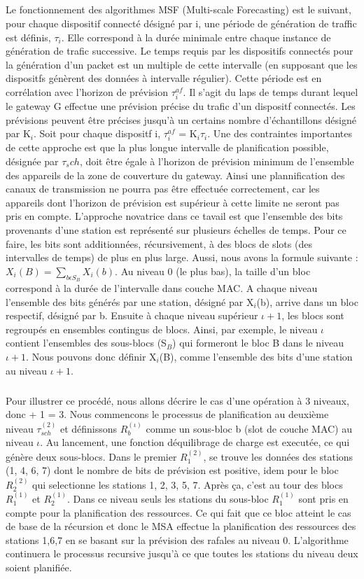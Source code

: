 \documentclass[12pt]{article}
\begin{document}
\subparagraph{} Le fonctionnement des algorithmes MSF (Multi-scale Forecasting) est le suivant, pour chaque dispositif connecté désigné par i, une période de génération de traffic est définis, $\tau_i$. Elle correspond à la durée minimale entre chaque instance de génération de trafic successive.
Le temps requis par les dispositifs connectés pour la génération d'un packet est un multiple de cette intervalle (en supposant que les dispositfs génèrent des données à intervalle régulier).
Cette période est en corrélation avec l'horizon de prévision $\tau^{af}_i$.
Il s'agit du laps de temps durant lequel le gateway G effectue une prévision précise du trafic d'un dispositf connectés. Les prévisions peuvent être précises jusqu'à un certains nombre d'échantillons désigné par K$_i$.
Soit pour chaque dispositf i, $\tau^{af}_i$ = K$_i$$\tau_i$.
Une des contraintes importantes de cette approche est que la plus longue intervalle de planification possible, désignée par $\tau_sch$, doit être égale à l'horizon de prévision minimum de l'ensemble des appareils de la zone de couverture du gateway.
Ainsi une plannification des canaux de transmission ne pourra pas être effectuée correctement, car les appareils dont l'horizon de prévision est supérieur à cette limite ne seront pas pris en compte.
L'approche novatrice dans ce tavail est que l'ensemble des bits provenants d'une station est représenté sur plusieurs échelles de temps. Pour ce faire, les bits sont additionnées, récursivement, à des blocs de slots (des intervalles de temps) de plus en plus large. 
Aussi, nous avons la formule suivante : $X_{i} (B) = \sum_{b\epsilon S_B} X_{i} (b)$. Au niveau 0 (le plus bas), la taille d'un bloc correspond à la durée de l'intervalle dans couche MAC. A chaque niveau l'ensemble des bits générés par une station, désigné par X$_i$(b), arrive dans un bloc respectif, désigné par b.
Ensuite à chaque niveau supérieur $\iota + 1$, les blocs sont regroupés en ensembles contingus de blocs. Ainsi, par exemple, le niveau $\iota$ contient l'ensembles des sous-blocs (S$_B$) qui formeront le bloc B dans le niveau $\iota + 1$. Nous pouvons donc définir X$_i$(B), comme l'ensemble des bits d'une station au niveau $\iota + 1$.
\subparagraph{} Pour illustrer ce procédé, nous allons décrire le cas d'une opération à 3 niveaux, donc \textscl + 1 = 3.
Nous commencons le processus de planification au deuxième niveau $\tau^{(2)}_{sch}$ et définissons $R^{(\iota)}_b$ comme un sous-bloc b (slot de couche MAC) au niveau $\iota$. Au lancement, une fonction déquilibrage de charge est executée, ce qui génère deux sous-blocs.
Dans le premier $R^{(2)}_1$, se trouve les données des stations (1, 4, 6, 7) dont le nombre de bits de prévision est positive, idem pour le bloc $R^{(2)}_2$ qui selectionne les stations 1, 2, 3, 5, 7. Après ça, c'est au tour des blocs $R^{(1)}_1$ et $R^{(1)}_2$. Dans ce niveau seuls les stations du sous-bloc $R^{(1)}_1$ sont pris en compte pour la planification des ressources.
Ce qui fait que ce bloc atteint le cas de base de la récursion et donc le MSA effectue la planification des ressources des stations 1,6,7 en se basant sur la prévision des rafales au niveau 0. L'algorithme continuera le processus recursive jusqu'à ce que toutes les stations du niveau deux soient planifiée. 
\end{document}
